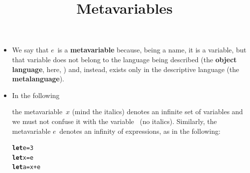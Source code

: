 \documentclass[wide]{slides}
\begin{document}
\begin{slide}
  \title{Metavariables}

  \begin{itemize}

    \item We say that \(e\)~is a \textbf{metavariable} because, being
      a name, it is a variable, but that variable does not belong to
      the language being described (the \textbf{object language},
      here, \OCaml) and, instead, exists only in the descriptive
      language (the \textbf{metalanguage}).

    \item In the following
      \begin{center}
      \end{center}
      the metavariable~\(x\) (mind the italics) denotes an infinite
      set of \OCaml variables and we must not confuse it with the
      \OCaml variable~ (no italics). Similarly, the
      metavariable \(e\)~denotes an infinity of expressions, as in the
      following:
\begin{alltt}
\textbf{let} e = 3
\textbf{let} x = e
\textbf{let} a = x + e
\end{alltt}

  \end{itemize}

\end{slide}
\end{document}
